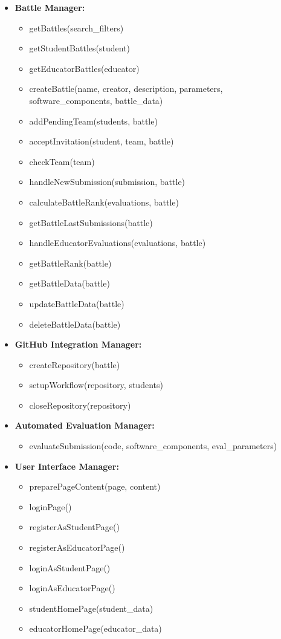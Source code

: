 \begin{itemize}
    \item \textbf{Battle Manager:}
    \begin{itemize}
        \item getBattles(search\_filters)
        \item getStudentBattles(student)
        \item getEducatorBattles(educator)
        \item createBattle(name, creator, description, parameters, software\_components, battle\_data)
        \item addPendingTeam(students, battle)
        \item acceptInvitation(student, team, battle)
        \item checkTeam(team)
        \item handleNewSubmission(submission, battle)
        \item calculateBattleRank(evaluations, battle)
        \item getBattleLastSubmissions(battle)
        \item handleEducatorEvaluations(evaluations, battle)
        \item getBattleRank(battle)
        \item getBattleData(battle)
        \item updateBattleData(battle)
        \item deleteBattleData(battle)
    \end{itemize}

\newpage
    \item \textbf{GitHub Integration Manager:}
    \begin{itemize}
        \item createRepository(battle)
        \item setupWorkflow(repository, students)
        \item closeRepository(repository)
    \end{itemize}


    \item \textbf{Automated Evaluation Manager:}
    \begin{itemize}
        \item evaluateSubmission(code, software\_components, eval\_parameters)
    \end{itemize}

    \item \textbf{User Interface Manager:}
    \begin{itemize}
        \item preparePageContent(page, content)
        \item loginPage()
        \item registerAsStudentPage()
        \item registerAsEducatorPage()
        \item loginAsStudentPage()
        \item loginAsEducatorPage()
        \item studentHomePage(student\_data)
        \item educatorHomePage(educator\_data)
        

\end{itemize}
\end{itemize}
